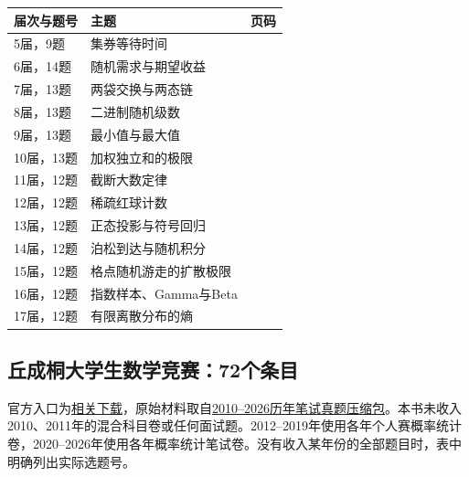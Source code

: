 \documentclass[UTF8,12pt,a4paper,fontset=fandol]{ctexbook}
\begin{document}
\begin{longtable}{@{}p{22mm}p{65mm}r@{}}\toprule 届次与题号 & 主题 & 页码\\\midrule\endhead

5届，9题 & 集券等待时间 & \pageref{pr:fin05-hi:9}\\

6届，14题 & 随机需求与期望收益 & \pageref{pr:fin06-hi:14}\\

7届，13题 & 两袋交换与两态链 & \pageref{pr:fin07-hi:13}\\

8届，13题 & 二进制随机级数 & \pageref{pr:fin08-hi:13}\\

9届，13题 & 最小值与最大值 & \pageref{pr:fin09-hi:13}\\

10届，13题 & 加权独立和的极限 & \pageref{pr:fin10-hi:13}\\

11届，12题 & 截断大数定律 & \pageref{pr:fin11-high:12}\\

12届，12题 & 稀疏红球计数 & \pageref{pr:fin12-high:12}\\

13届，12题 & 正态投影与符号回归 & \pageref{pr:fin13-high:12}\\

14届，12题 & 泊松到达与随机积分 & \pageref{pr:fin14-high:12}\\

15届，12题 & 格点随机游走的扩散极限 & \pageref{pr:fin15-high:12}\\

16届，12题 & 指数样本、Gamma与Beta & \pageref{pr:fin16-high:12}\\

17届，12题 & 有限离散分布的熵 & \pageref{pr:fin17-high:12}\\

\bottomrule\end{longtable}

\subsection*{丘成桐大学生数学竞赛：72个条目}

官方入口为\href{https://yau-contest.com/lists-jxxg.html}{相关下载}，原始材料取自\href{https://yau-contest.com/index/reldown?id=9}{2010--2026历年笔试真题压缩包}。本书未收入2010、2011年的混合科目卷或任何面试题。2012--2019年使用各年个人赛概率统计卷，2020--2026年使用各年概率统计笔试卷。没有收入某年份的全部题目时，表中明确列出实际选题号。
\end{document}

